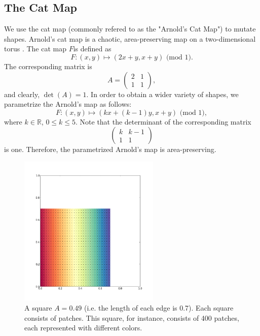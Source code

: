 \documentclass[12pt]{reedmcm}
\begin{document}
\subsection{The Cat Map}
We use the cat map (commonly refered to as the "Arnold's Cat Map") to mutate shapes.
Arnold's cat map is a chaotic, area-preserving map on a two-dimensional torus \citep{hilborn}.
The cat map $F$is defined as
\begin{equation*}
  F: (x,y) \mapsto (2x + y, x + y) \mbox{ (mod 1)}.
\end{equation*}
The corresponding matrix is
\begin{equation*}
A =
\begin{pmatrix}
    2 & 1  \\
    1 & 1  
  \end{pmatrix},
\end{equation*}
and clearly, $\det(A) = 1$.
In order to obtain a wider variety of shapes, we parametrize the Arnold's map as follows:
\begin{equation*}
  F: (x,y) \mapsto (kx + (k-1)y, x + y) \mbox{ (mod 1)},
\end{equation*}
where $k \in \mathbb{R}$, $0 \leq k \leq 5$.
Note that the determinant of the corresponding matrix
\begin{equation*}
\begin{pmatrix}
    k & k-1  \\
    1 & 1  
  \end{pmatrix}
\end{equation*}
is one.
Therefore, the parametrized Arnold's map is area-preserving.
\begin{figure}[t]
  \centering
  \includegraphics[width=0.6\textwidth]{square_049_900}
  \caption{A square $A = 0.49$ (i.e. the length of each edge is 0.7). Each square consists of patches. This square, for instance, consists of 400 patches, each represented with different colors.}
  \label{fig:square}
\end{figure}
\end{document}
